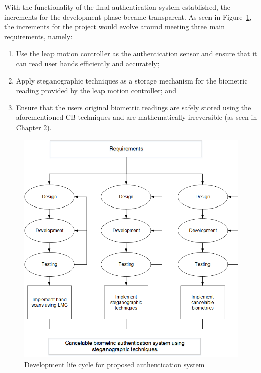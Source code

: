 With the functionality of the final authentication system established, the increments for the development phase became transparent. As seen in Figure~\ref{fig:Development life cycle for proposed authentication system}, the increments for the project would evolve around meeting three main requirements, namely:

    \begin{enumerate}[label=\roman*.]
        \item Use the leap motion controller as the authentication sensor and ensure that it can read user hands efficiently and accurately;
        \item Apply steganographic techniques as a storage mechanism for the biometric reading provided by the leap motion controller; and
        \item Ensure that the users original biometric readings are safely stored using the aforementioned CB techniques and are mathematically irreversible (as seen in Chapter 2).
    \end{enumerate}
    
    
    \begin{figure}[htbp!] 
    \centering    
    \includegraphics[width=1.0\textwidth]{Chapter3/Figs/Figure3-3.png}
    \caption[Development life cycle for proposed authentication system]{Development life cycle for proposed authentication system}
    \label{fig:Development life cycle for proposed authentication system}
    \end{figure}
    
